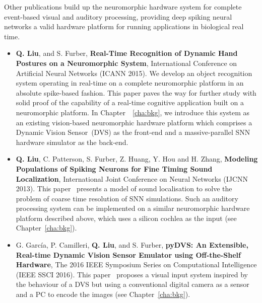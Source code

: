 	Other publications build up the neuromorphic hardware system for complete event-based visual and auditory processing, providing deep spiking neural networks a valid hardware platform for running applications in biological real time.
\begin{itemize}
	\item 
	\textbf{Q. Liu}, and S. Furber, \textbf{Real-Time Recognition of Dynamic Hand Postures on a Neuromorphic System}, International Conference on Artificial Neural Networks (ICANN 2015).
	We develop an object recognition system operating in real-time on a complete neuromorphic platform in an absolute spike-based fashion.
	This paper paves the way for further study with solid proof of the capability of a real-time cognitive application built on a neuromorphic platform.
	In Chapter~~\ref{cha:bkg}, we introduce this system as an existing vision-based neuromorphic hardware platform which comprises a Dynamic Vision Sensor~(DVS) as the front-end and a massive-parallel SNN hardware simulator as the back-end. 

	\item
	\textbf{Q. Liu}, C. Patterson, S. Furber, Z. Huang, Y. Hou and H. Zhang, \textbf{Modeling Populations of Spiking Neurons for Fine Timing Sound Localization}, International Joint Conference on Neural Networks (IJCNN 2013).
	This paper~\citep{liu2013modeling} presents a model of sound localisation to solve the problem of coarse time resolution of SNN simulations.
	Such an auditory processing system can be implemented on a similar neuromorphic hardware platform described above, which uses a silicon cochlea as the input (see Chapter~\ref{cha:bkg}).

	\item 
	G. Garc\'ia, P. Camilleri, \textbf{Q. Liu}, and S. Furber, \textbf{pyDVS: An Extensible, Real-time Dynamic Vision Sensor Emulator using Off-the-Shelf Hardware}, The 2016 IEEE Symposium Series on Computational Intelligence (IEEE SSCI 2016).
	This paper~\citep{7850249} proposes a visual input system inspired by the behaviour of a DVS but using a conventional digital camera as a sensor and a PC to encode the images (see Chapter~\ref{cha:bkg}).
\end{itemize}


